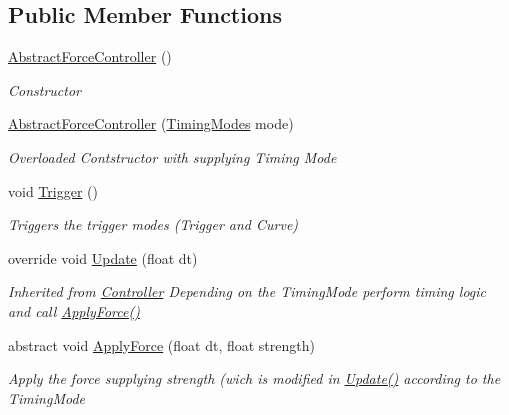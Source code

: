 \subsection*{Public Member Functions}
\begin{DoxyCompactItemize}
\item 
\hyperlink{class_farseer_physics_1_1_controllers_1_1_abstract_force_controller_a5b6ce208238fb56335f0b3bf304c748d}{Abstract\+Force\+Controller} ()
\begin{DoxyCompactList}\small\item\em Constructor \end{DoxyCompactList}\item 
\hyperlink{class_farseer_physics_1_1_controllers_1_1_abstract_force_controller_a9bffc63e3ad30e00fe8d67d7e7cbb486}{Abstract\+Force\+Controller} (\hyperlink{class_farseer_physics_1_1_controllers_1_1_abstract_force_controller_a5dc6c4b2c041b7c5c084873d89b4b62b}{Timing\+Modes} mode)
\begin{DoxyCompactList}\small\item\em Overloaded Contstructor with supplying Timing Mode \end{DoxyCompactList}\item 
void \hyperlink{class_farseer_physics_1_1_controllers_1_1_abstract_force_controller_a2546e91b21ebbd41af7745d8b785611f}{Trigger} ()
\begin{DoxyCompactList}\small\item\em Triggers the trigger modes (Trigger and Curve) \end{DoxyCompactList}\item 
override void \hyperlink{class_farseer_physics_1_1_controllers_1_1_abstract_force_controller_a63753663663088aa7f1a04f785f25bf7}{Update} (float dt)
\begin{DoxyCompactList}\small\item\em Inherited from \hyperlink{class_farseer_physics_1_1_controllers_1_1_controller}{Controller} Depending on the Timing\+Mode perform timing logic and call \hyperlink{class_farseer_physics_1_1_controllers_1_1_abstract_force_controller_ab180ac3ceeb3d3331f3cda632573f64e}{Apply\+Force()} \end{DoxyCompactList}\item 
abstract void \hyperlink{class_farseer_physics_1_1_controllers_1_1_abstract_force_controller_ab180ac3ceeb3d3331f3cda632573f64e}{Apply\+Force} (float dt, float strength)
\begin{DoxyCompactList}\small\item\em Apply the force supplying strength (wich is modified in \hyperlink{class_farseer_physics_1_1_controllers_1_1_abstract_force_controller_a63753663663088aa7f1a04f785f25bf7}{Update()} according to the Timing\+Mode \end{DoxyCompactList}\end{DoxyCompactItemize}
